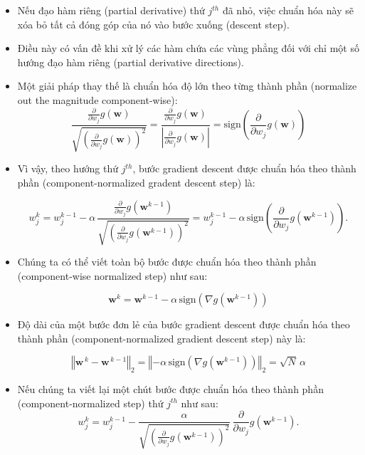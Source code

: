 \documentclass{book}
\begin{document}
\begin{itemize}
    \item Nếu đạo hàm riêng (partial derivative) thứ $j^{th}$ đã nhỏ, việc chuẩn hóa này sẽ xóa bỏ tất cả đóng góp của nó vào bước xuống (descent step).
    \item Điều này có vấn đề khi xử lý các hàm chứa các vùng phẳng đối với chỉ một số hướng đạo hàm riêng (partial derivative directions).
    \item Một giải pháp thay thế là chuẩn hóa độ lớn theo từng thành phần (normalize out the magnitude component-wise):
    \begin{equation*}
        \frac{\frac{\partial}{\partial w_j}g\left(\mathbf{w}\right)}{\sqrt{\left(\frac{\partial}{\partial w_j}g\left(\mathbf{w}\right)\right)^2}} = \frac{\frac{\partial}{\partial w_j}g\left(\mathbf{w}\right)}{\left|\frac{\partial}{\partial w_j} g\left(\mathbf{w}\right)\right|} = \text{sign}\left(\frac{\partial}{\partial w_j}g\left(\mathbf{w}\right)\right)
    \end{equation*}  
    \item Vì vậy, theo hướng thứ $j^{th}$, bước gradient descent được chuẩn hóa theo thành phần (component-normalized gradent descent step) là:

    \begin{equation*}
        w_j^k = w_j^{k-1} - \alpha \, \frac{\frac{\partial}{\partial w_j}g\left(\mathbf{w}^{k-1}\right)}{{\sqrt{\left(\frac{\partial}{\partial w_j}g\left(\mathbf{w}^{k-1}\right)\right)^2}}} = w_j^{k-1} - \alpha \, \text{sign}\left(\frac{\partial}{\partial w_j}g\left(\mathbf{w}^{k-1}\right)\right).
    \end{equation*}      
    \item Chúng ta có thể viết toàn bộ bước được chuẩn hóa theo thành phần (component-wise normalized step) như sau:

    \begin{equation*}
        \mathbf{w}^k = \mathbf{w}^{k-1} - \alpha \, \text{sign}\left(\nabla g\left(\mathbf{w}^{k-1}\right)\right)
    \end{equation*}
    \item Độ dài của một bước đơn lẻ của bước gradient descent được chuẩn hóa theo thành phần (component-normalized gradient descent step) này là:
    
    \begin{equation*}
        \left\Vert \mathbf{w}^{\,k} - \mathbf{w}^{\,k-1} \right\Vert_2 = \left\Vert -\alpha \, \text{sign}\left(\nabla g\left(\mathbf{w}^{k-1}\right)\right)  \right\Vert_2  = \sqrt{N} \, \alpha
    \end{equation*}
    \item Nếu chúng ta viết lại một chút bước được chuẩn hóa theo thành phần (component-normalized step) thứ $j^{th}$ như sau:
    \begin{equation*}
        w_j^k = w_j^{k-1} - \frac{\alpha}{\sqrt{\left(\frac{\partial}{\partial w_j} g\left(\mathbf{w}^{k-1}\right)\right)^2} } \, \frac{\partial}{\partial w_j}g\left(\mathbf{w}^{k-1}\right).
    \end{equation*}
\end{itemize}
\end{document}
